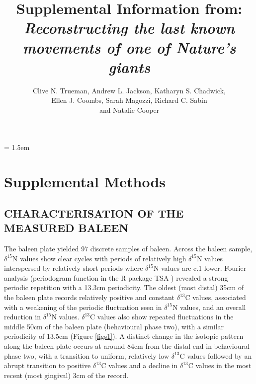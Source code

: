 \documentclass[a4paper,10pt]{article}
\title{Supplemental Information from:\\
\textit{Reconstructing the last known movements of one of Nature's giants}}
\author{Clive N. Trueman, Andrew L. Jackson, Katharyn S. Chadwick,\\ 
Ellen J. Coombs, Sarah Magozzi, Richard C. Sabin\\
and Natalie Cooper}
\date{}
\begin{document}

\maketitle

\parindent = 1.5em
\addtolength{\parskip}{.3em}


\section*{Supplemental Methods}
 
\subsection*{CHARACTERISATION OF THE MEASURED BALEEN}
The baleen plate yielded 97 discrete samples of baleen. 
Across the baleen sample, $\delta^{15}$N values show clear cycles with periods of relatively high $\delta^{15}$N values interspersed by relatively short periods where $\delta^{15}$N values are c.1\text{\textperthousand} lower. 
Fourier analysis (periodogram function in the R package TSA \citep{Chan:2012aa}) revealed a strong periodic repetition with a 13.3cm periodicity. 
The oldest (most distal) 35cm of the baleen plate records relatively positive and constant $\delta^{13}$C values, associated with a weakening of the periodic fluctuation seen in $\delta^{15}$N values, and an overall reduction in $\delta^{15}$N values. 
$\delta^{13}$C values also show repeated fluctuations in the middle 50cm of the baleen plate (behavioural phase two), with a similar periodicity of 13.5cm (Figure \ref{figs1}). 
A distinct change in the isotopic pattern along the baleen plate occurs at around 84cm from the distal end in behavioural phase two, with a transition to uniform, relatively low $\delta^{13}$C values followed by an abrupt transition to positive $\delta^{13}$C values and a decline in $\delta^{13}$C values in the most recent (most gingival) 3cm of the record.
\end{document}
